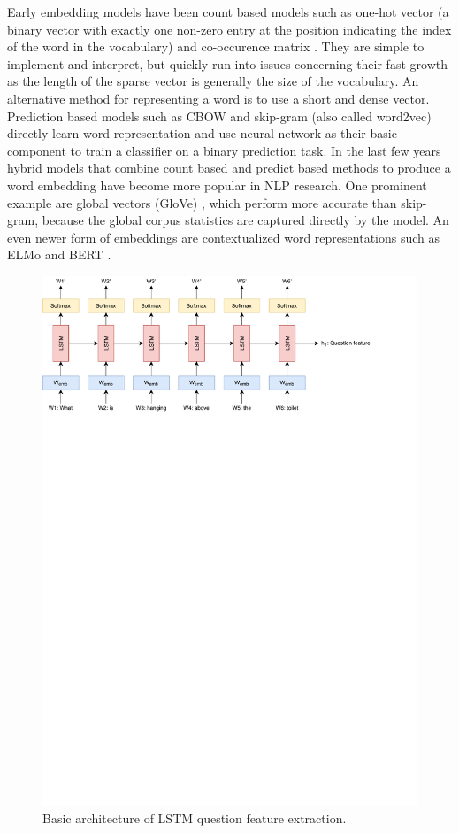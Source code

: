 \documentclass{article}
\begin{document}
Early embedding models have been count based models such as one-hot vector (a binary vector with exactly one non-zero entry at the position indicating the index of the word in the vocabulary) and co-occurence matrix \citep{miller1991contextual}. They are simple to implement and interpret, but quickly run into issues concerning their fast growth as the length of the sparse vector is generally the size of the vocabulary. An alternative method for representing a word is to use a short and dense vector. Prediction based models such as CBOW and skip-gram (also called word2vec) \citep{mikolov2013efficient} directly learn word representation and use neural network as their basic component to train a classifier on a binary prediction task. In the last few years hybrid models that combine count based and predict based methods to produce a word embedding have become more popular in NLP research. One prominent example are global vectors (GloVe) \citep{pennington2014glove}, which perform more accurate than skip-gram, because the global corpus statistics are captured directly by the model. An even newer form of embeddings are contextualized word representations such as ELMo \citep{peters2018elmo} and BERT \citep{devlin-etal-2019-bert}.

\begin{figure}[H]
	\centering
	\includegraphics[width=\linewidth]{lstm.pdf}
	\caption{Basic architecture of LSTM question feature extraction.}
	\label{fig:lstm}
\end{figure}
\end{document}
